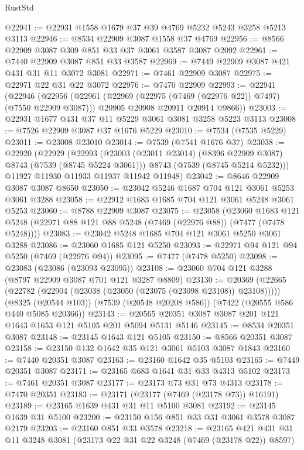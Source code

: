 \begin{lexlean}{RustStd}
\begin{coremodule}
@22941 := @22931 @1558 @1679 @37 @39 @4769 @5232 @5243 @3258 @5213 @3113
@22946 := @8534 @22909 @3087 @1558 @37 @4769
@22956 := @8566 @22909 @3087 @309 @851 @33 @37 @3061 @3587 @3087 @2092
@22961 := @7440 @22909 @3087 @851 @33 @3587
@22969 := @7449 @22909 @3087 @421 @431 @31 @11 @3072 @3081
@22971 := @7461 @22909 @3087
@22975 := @22971 @22 @31 @22 @3072
@22976 := @7470 @22909
@22993 := @22941
    (@22946
      (@22956
        (@22961 (@22969 (@22975 (@7469 (@22976 @22)) @7497) (@7550 @22909 @3087)))
        @20905
        @20908
        @20911
        @20914
        @9866))
@23003 := @22931 @1677 @431 @37 @11 @5229 @3061 @3081 @3258 @5223 @3113
@23008 := @7526 @22909 @3087 @37 @1676 @5229
@23010 := @7534 (@7535 @5229)
@23011 := @23008 @23010
@23014 := @7539 (@7541 @1676 @37)
@23038 := @22920
    (@22929
      (@22993
        (@23003 (@23011 @23014) (@8396 @22909 @3087) @8743 (@7539 (@8745 @5224 @3061)))
        @8743
        (@7539 (@8745 @5214 @5232)))
      @11927
      @11930
      @11933
      @11937
      @11942
      @11948)
@23042 := @8646 @22909 @3087 @3087 @8650
@23050 := @23042 @5246 @1687 @704 @121 @3061 @5253 @3061 @3288
@23058 := @22912 @1683 @1685 @704 @121 @3061 @5248 @3061 @5253
@23060 := @8788 @22909 @3087
@23075 := @23058
    (@23060 @1683 @121 @5248 (@22971 @88 @121 @88 @5248 (@7469 (@22976 @88)) (@7477 (@7478 @5248))))
@23083 := @23042 @5248 @1685 @704 @121 @3061 @5250 @3061 @3288
@23086 := @23060 @1685 @121 @5250
@23093 := @22971 @94 @121 @94 @5250 (@7469 (@22976 @94))
@23095 := @7477 (@7478 @5250)
@23098 := @23083 (@23086 (@23093 @23095))
@23108 := @23060 @704 @121 @3288 (@8797 @22909 @3087 @701 @121 @3287 @8809)
@23130 := @20369
    (@22665 (@22782 (@22904 (@23038 (@23050 (@23075 (@23098 @23108)) @23108)))))
    (@8325 (@20544 @103))
    (@7539 (@20548 @20208 @586))
    (@7422 (@20555 @586 @440 @5085 @20366))
@23143 := @20565 @20351 @3087 @3087 @201 @121 @1643 @1653 @121 @5105 @201 @5094 @5131 @5146
@23145 := @8534 @20351 @3087
@23148 := @23145 @1643 @121 @5105
@23150 := @8566 @20351 @3087
@23158 := @23150 @132 @1642 @35 @121 @3061 @5103 @3087 @1843
@23160 := @7440 @20351 @3087
@23163 := @23160 @1642 @35 @5103
@23165 := @7449 @20351 @3087
@23171 := @23165 @683 @1641 @31 @33 @4313 @5102
@23173 := @7461 @20351 @3087
@23177 := @23173 @73 @31 @73 @4313
@23178 := @7470 @20351
@23183 := @23171 (@23177 (@7469 (@23178 @73)) @16191)
@23189 := @23165 @1639 @431 @31 @11 @5100 @3081
@23192 := @23145 @1639 @31 @5100
@23200 := @23150 @156 @851 @33 @31 @3061 @3578 @3087 @2179
@23203 := @23160 @851 @33 @3578
@23218 := @23165 @421 @431 @31 @11 @3248 @3081 (@23173 @22 @31 @22 @3248 (@7469 (@23178 @22)) @8597)

\end{coremodule}
\end{lexlean}
